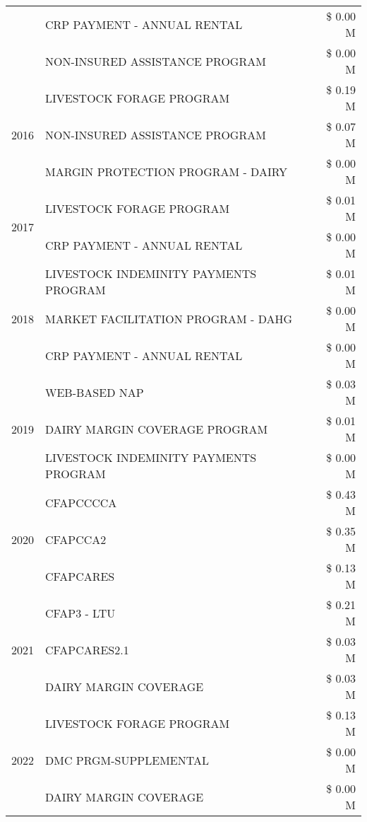 \begin{tabular}{llr}
 & CRP PAYMENT - ANNUAL RENTAL & \$ 0.00 M \\
 & NON-INSURED ASSISTANCE PROGRAM & \$ 0.00 M \\
\cline{1-3}
\multirow[t]{3}{*}{2016} & LIVESTOCK FORAGE PROGRAM & \$ 0.19 M \\
 & NON-INSURED ASSISTANCE PROGRAM & \$ 0.07 M \\
 & MARGIN PROTECTION PROGRAM - DAIRY & \$ 0.00 M \\
\cline{1-3}
\multirow[t]{2}{*}{2017} & LIVESTOCK FORAGE PROGRAM & \$ 0.01 M \\
 & CRP PAYMENT - ANNUAL RENTAL & \$ 0.00 M \\
\cline{1-3}
\multirow[t]{3}{*}{2018} & LIVESTOCK INDEMINITY PAYMENTS PROGRAM & \$ 0.01 M \\
 & MARKET FACILITATION PROGRAM - DAHG & \$ 0.00 M \\
 & CRP PAYMENT - ANNUAL RENTAL & \$ 0.00 M \\
\cline{1-3}
\multirow[t]{3}{*}{2019} & WEB-BASED NAP & \$ 0.03 M \\
 & DAIRY MARGIN COVERAGE PROGRAM & \$ 0.01 M \\
 & LIVESTOCK INDEMINITY PAYMENTS PROGRAM & \$ 0.00 M \\
\cline{1-3}
\multirow[t]{3}{*}{2020} & CFAPCCCCA & \$ 0.43 M \\
 & CFAPCCA2 & \$ 0.35 M \\
 & CFAPCARES & \$ 0.13 M \\
\cline{1-3}
\multirow[t]{3}{*}{2021} & CFAP3 - LTU & \$ 0.21 M \\
 & CFAPCARES2.1 & \$ 0.03 M \\
 & DAIRY MARGIN COVERAGE & \$ 0.03 M \\
\cline{1-3}
\multirow[t]{3}{*}{2022} & LIVESTOCK FORAGE PROGRAM & \$ 0.13 M \\
 & DMC PRGM-SUPPLEMENTAL & \$ 0.00 M \\
 & DAIRY MARGIN COVERAGE & \$ 0.00 M \\
\cline{1-3}
\bottomrule
\end{tabular}
